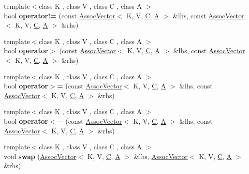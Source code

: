 \begin{DoxyCompactItemize}
\item 
\hypertarget{namespaceLoki_a4bd2d26e2a4b894ca7611ac096434c21}{}{\footnotesize template$<$class K , class V , class C , class A $>$ }\\bool {\bfseries operator!=} (const \hyperlink{classLoki_1_1AssocVector}{Assoc\+Vector}$<$ K, V, \hyperlink{classC}{C}, \hyperlink{structA}{A} $>$ \&lhs, const \hyperlink{classLoki_1_1AssocVector}{Assoc\+Vector}$<$ K, V, \hyperlink{classC}{C}, \hyperlink{structA}{A} $>$ \&rhs)\label{namespaceLoki_a4bd2d26e2a4b894ca7611ac096434c21}

\item 
\hypertarget{namespaceLoki_acc91f1a4d6b2684be1ae9cc97b36636e}{}{\footnotesize template$<$class K , class V , class C , class A $>$ }\\bool {\bfseries operator$>$} (const \hyperlink{classLoki_1_1AssocVector}{Assoc\+Vector}$<$ K, V, \hyperlink{classC}{C}, \hyperlink{structA}{A} $>$ \&lhs, const \hyperlink{classLoki_1_1AssocVector}{Assoc\+Vector}$<$ K, V, \hyperlink{classC}{C}, \hyperlink{structA}{A} $>$ \&rhs)\label{namespaceLoki_acc91f1a4d6b2684be1ae9cc97b36636e}

\item 
\hypertarget{namespaceLoki_a3678dd23d67866599ad3c43ecee2ff34}{}{\footnotesize template$<$class K , class V , class C , class A $>$ }\\bool {\bfseries operator$>$=} (const \hyperlink{classLoki_1_1AssocVector}{Assoc\+Vector}$<$ K, V, \hyperlink{classC}{C}, \hyperlink{structA}{A} $>$ \&lhs, const \hyperlink{classLoki_1_1AssocVector}{Assoc\+Vector}$<$ K, V, \hyperlink{classC}{C}, \hyperlink{structA}{A} $>$ \&rhs)\label{namespaceLoki_a3678dd23d67866599ad3c43ecee2ff34}

\item 
\hypertarget{namespaceLoki_ae784f4505d4e82cdca799b4e4d9db886}{}{\footnotesize template$<$class K , class V , class C , class A $>$ }\\bool {\bfseries operator$<$=} (const \hyperlink{classLoki_1_1AssocVector}{Assoc\+Vector}$<$ K, V, \hyperlink{classC}{C}, \hyperlink{structA}{A} $>$ \&lhs, const \hyperlink{classLoki_1_1AssocVector}{Assoc\+Vector}$<$ K, V, \hyperlink{classC}{C}, \hyperlink{structA}{A} $>$ \&rhs)\label{namespaceLoki_ae784f4505d4e82cdca799b4e4d9db886}

\item 
\hypertarget{namespaceLoki_adbe957affd452026980681c7bd18f950}{}{\footnotesize template$<$class K , class V , class C , class A $>$ }\\void {\bfseries swap} (\hyperlink{classLoki_1_1AssocVector}{Assoc\+Vector}$<$ K, V, \hyperlink{classC}{C}, \hyperlink{structA}{A} $>$ \&lhs, \hyperlink{classLoki_1_1AssocVector}{Assoc\+Vector}$<$ K, V, \hyperlink{classC}{C}, \hyperlink{structA}{A} $>$ \&rhs)\label{namespaceLoki_adbe957affd452026980681c7bd18f950}


\end{DoxyCompactItemize}
